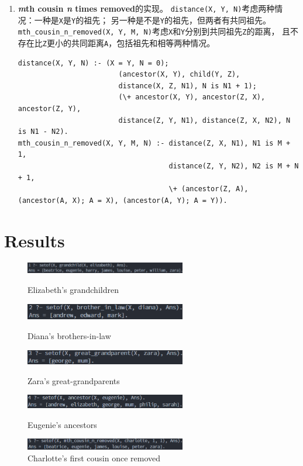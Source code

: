 ﻿\documentclass[a4paper, 11pt]{article}
\begin{document}
\begin{enumerate}
\item \textbf{\emph{m}th cousin \emph{n} times removed}的实现。
\texttt{distance(X, Y, N)}考虑两种情况：一种是\texttt{X}是\texttt{Y}的祖先；
另一种是不是\texttt{Y}的祖先，但两者有共同祖先。
\texttt{mth\_cousin\_n\_removed(X, Y, M, N)}考虑\texttt{X}和\texttt{Y}分别到共同祖先\texttt{Z}的距离，
且不存在比\texttt{Z}更小的共同距离\texttt{A}，包括祖先和相等两种情况。
\begin{lstlisting}
distance(X, Y, N) :- (X = Y, N = 0);
                        (ancestor(X, Y), child(Y, Z),
                        distance(X, Z, N1), N is N1 + 1);
                        (\+ ancestor(X, Y), ancestor(Z, X), ancestor(Z, Y),
                        distance(Z, Y, N1), distance(Z, X, N2), N is N1 - N2).
mth_cousin_n_removed(X, Y, M, N) :- distance(Z, X, N1), N1 is M + 1,
                                    distance(Z, Y, N2), N2 is M + N + 1,
                                    \+ (ancestor(Z, A), (ancestor(A, X); A = X), (ancestor(A, Y); A = Y)).
\end{lstlisting}
\end{enumerate}
\section{Results}
\begin{figure}[ht]
	\centering
	\includegraphics[width=7cm]{1.png}
	\caption{Elizabeth’s grandchildren}
	\centering
	\includegraphics[width=7cm]{2.png}
	\caption{Diana’s brothers-in-law}
	\centering
	\includegraphics[width=7cm]{3.png}
	\caption{Zara’s great-grandparents}
	\centering
	\includegraphics[width=7cm]{4.png}
	\caption{Eugenie’s ancestors}
	\centering
	\includegraphics[width=7cm]{5.png}
	\caption{Charlotte’s first cousin once removed}
\end{figure}

%
%
\end{document}
